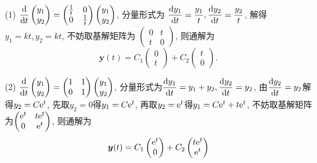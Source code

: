 \begin{solution}
  (1) $\displaystyle\frac{\mathop{}\!\mathrm{d}}{\mathop{}\!\mathrm{d} t}\begin{pmatrix}y_1\\y_2\end{pmatrix}=\begin{pmatrix}\frac{1}{t}&0\\0&\frac{1}{t}\end{pmatrix}\begin{pmatrix}y_1\\y_2\end{pmatrix}$, 
  分量形式为 $\displaystyle\frac{\mathop{}\!\mathrm{d} y_1}{\mathop{}\!\mathrm{d} t}=\frac{y_1}{t},\frac{\mathop{}\!\mathrm{d} y_2}{\mathop{}\!\mathrm{d} t}=\frac{y_2}{t}$, 
  解得 $y_1=kt,y_2=kt$, 不妨取基解矩阵为 $\begin{pmatrix}0&t\\t&0\end{pmatrix}$, 则通解为
  \[\bm{y}(t)=C_1\begin{pmatrix}0\\t\end{pmatrix}+C_2\begin{pmatrix}t\\0\end{pmatrix}.\]

  (2) $\displaystyle\frac{\mathop{}\!\mathrm{d}}{\mathop{}\!\mathrm{d} t}\begin{pmatrix}y_1\\y_2\end{pmatrix}=\begin{pmatrix}1&1\\0&1\end{pmatrix}\begin{pmatrix}y_1\\y_2\end{pmatrix}$, 
  分量形式为$\displaystyle\frac{\mathop{}\!\mathrm{d} y_1}{\mathop{}\!\mathrm{d} t}=y_1+y_2,\frac{\mathop{}\!\mathrm{d} y_2}{\mathop{}\!\mathrm{d} t}=y_2$, 
  由$\displaystyle\frac{\mathop{}\!\mathrm{d} y_2}{\mathop{}\!\mathrm{d} t}=y_2$解得$y_2=C\mathrm{e}^t$, 先取$y_2=0$得$y_1=C\mathrm{e}^t$, 
  再取$y_2=\mathrm{e}^t$得$y_1=C\mathrm{e}^t+t\mathrm{e}^t$, 不妨取基解矩阵为$\begin{pmatrix}\mathrm{e}^t&t\mathrm{e}^t\\0&\mathrm{e}^t\end{pmatrix}$, 则通解为
  \[\bm{y}(t)=C_1\begin{pmatrix}\mathrm{e}^t\\0\end{pmatrix}+C_2\begin{pmatrix}t\mathrm{e}^t\\\mathrm{e}^t\end{pmatrix}\]


\end{solution}
